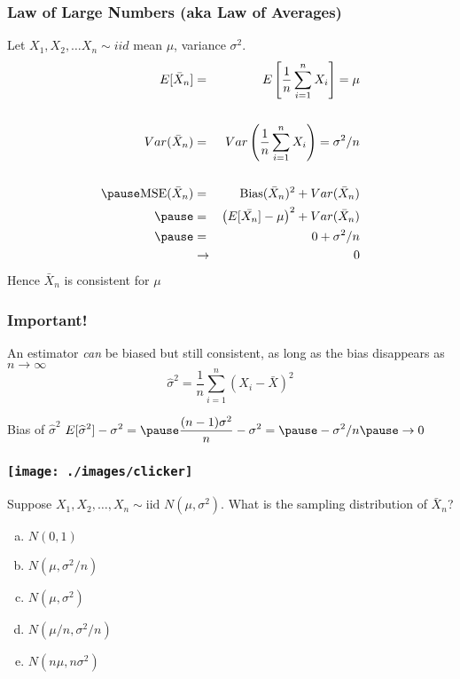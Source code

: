 \documentclass[handout]{beamer}
\begin{document}
\begin{frame}
\frametitle{Law of Large Numbers (aka Law of Averages)}
Let $X_1, X_2, \hdots X_n \sim iid$ mean $\mu$, variance $\sigma^2$. 
	\begin{eqnarray*}
			E[\bar{X}_n] &=&  E \left[\frac{1}{n}\sum_{i=1}^n X_i\right] = \mu\\\\ 
      Var(\bar{X}_n) &=& Var\left(\frac{1}{n}\sum_{i=1}^n X_i  \right) = \sigma^2/n\\\\ \pause
			\mbox{MSE}(\bar{X}_n) &=& \mbox{Bias}(\bar{X}_n)^2 + Var(\bar{X}_n)\\\pause
				&=& \left(E[\bar{X_n}] - \mu\right)^2 + Var(\bar{X}_n)\\ \pause
				&=& 0 + \sigma^2/n\\ 
				&\rightarrow& 0
	\end{eqnarray*}
	\alert{Hence $\bar{X}_n$ is consistent for $\mu$}
\end{frame}

\begin{frame}
\frametitle{Important! }

An estimator \emph{can} be biased but still consistent, as long as the bias disappears as $n \rightarrow \infty$
$$\widehat{\sigma}^2 = \frac{1}{n}\sum_{i=1}^n \left(X_i - \bar{X}\right)^2$$


\begin{block}{Bias of $\widehat{\sigma}^2$}
\vspace{0.75em}
$\displaystyle E[\widehat{\sigma}^2 ] - \sigma^2 = \pause \frac{(n-1)\sigma^2}{n}  - \sigma^2 =  \pause -\sigma^2/n \pause \rightarrow 0$
\end{block}


\end{frame}




\begin{frame}
\frametitle{\texttt{[image: ./images/clicker]}}
Suppose $X_1, X_2, \hdots, X_n \sim \mbox{iid } N(\mu,\sigma^2)$. What is the sampling distribution of $\bar{X}_n$?

\begin{enumerate}[(a)]
\item $N(0,1)$
\item $N(\mu, \sigma^2/n)$
\item $N(\mu, \sigma^2)$
\item $N(\mu/n, \sigma^2/n)$
\item $N(n\mu, n\sigma^2)$
\end{enumerate}

\end{frame}
\end{document}
